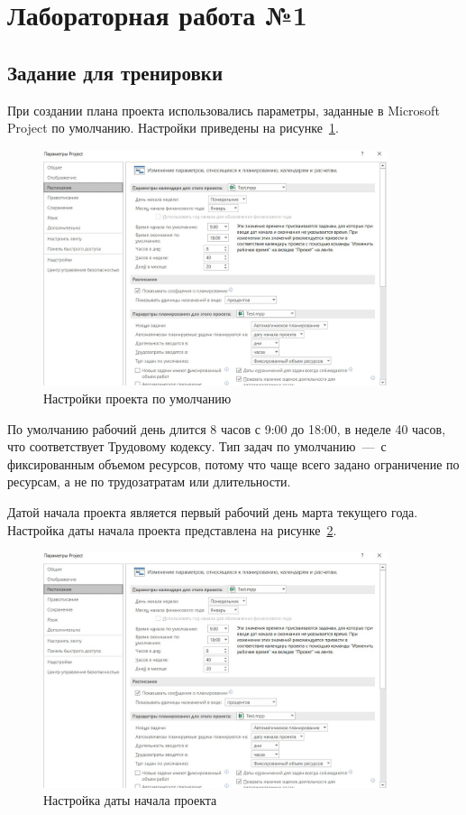 \setcounter{page}{2}

\section{Лабораторная работа №1}

\subsection{Задание для тренировки}

При создании плана проекта использовались параметры, заданные в Microsoft Project по умолчанию.
Настройки приведены на рисунке~\ref{fig:test_params}.

\begin{figure}[H]
	\centering
	\includegraphics[width=0.9\textwidth]{img/lab1/test/params.jpg}
	\caption{Настройки проекта по умолчанию}
	\label{fig:test_params}
\end{figure}

По умолчанию рабочий день длится 8 часов с 9:00 до 18:00, в неделе 40 часов, что соответствует Трудовому кодексу.
Тип задач по умолчанию~---~с фиксированным объемом ресурсов, потому что чаще всего задано ограничение по ресурсам, а не по трудозатратам или длительности.

Датой начала проекта является первый рабочий день марта текущего года.
Настройка даты начала проекта представлена на рисунке~\ref{fig:proj_start}.

\begin{figure}[H]
	\centering
	\includegraphics[width=0.9\textwidth]{img/lab1/test/params.jpg}
	\caption{Настройка даты начала проекта}
	\label{fig:proj_start}
\end{figure}

